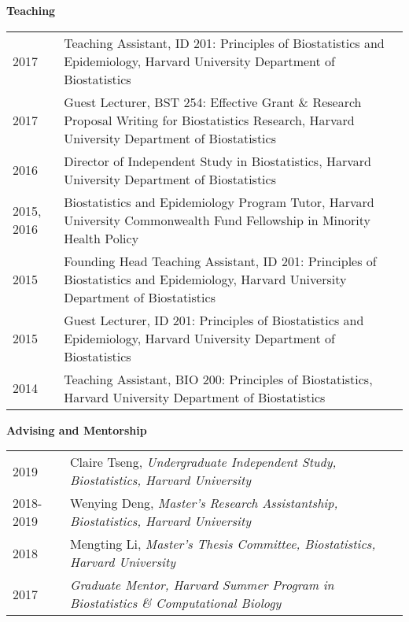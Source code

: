 \documentclass[10pt]{article}
\begin{document}
\indent \textbf{Teaching} 
\begin{center}
	\begin{table}[H]
		\centering
		\begin{tabular}{@{}p{2cm}@{}@{}p{14.9cm}@{}}
			2017  & Teaching Assistant, ID 201: Principles of Biostatistics and Epidemiology, Harvard University Department of Biostatistics                 \\ 
			2017  & Guest Lecturer, BST 254: Effective Grant \& Research Proposal Writing for Biostatistics Research, Harvard University Department of Biostatistics                 \\ 
			2016  & Director of Independent Study in Biostatistics, Harvard University Department of Biostatistics                 \\ 
			2015, 2016  & Biostatistics and Epidemiology Program Tutor, Harvard University Commonwealth Fund Fellowship in Minority Health Policy                 \\ 
			2015  & Founding Head Teaching Assistant, ID 201: Principles of Biostatistics and Epidemiology, Harvard University Department of Biostatistics                 \\ 
			2015  & Guest Lecturer, ID 201: Principles of Biostatistics and Epidemiology, Harvard University Department of Biostatistics                 \\ 
			2014  & Teaching Assistant, BIO 200: Principles of Biostatistics, Harvard University Department of Biostatistics                
		\end{tabular}
	\end{table}
\end{center}

\textbf{Advising and Mentorship} 
\setlength\intextsep{0mm}
\begin{center}
	\begin{table}[H]
		\centering
		\begin{tabular}{@{}p{2cm}@{}@{}p{14.9cm}@{}}
			2019  & Claire Tseng, \textit{Undergraduate Independent Study, Biostatistics, Harvard University}  \\ 
			2018-2019  & Wenying Deng, \textit{Master’s Research Assistantship, Biostatistics, Harvard University}   \\ 
			2018  & Mengting Li,  \textit{Master’s Thesis Committee, Biostatistics, Harvard University }  \\ 
			2017  &  \textit{Graduate Mentor, Harvard Summer Program in Biostatistics \& Computational Biology   } 
		\end{tabular}
	\end{table}
\end{center}
\end{document}
